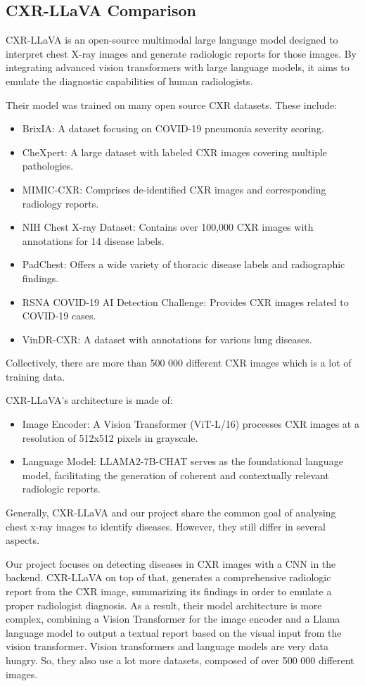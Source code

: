\documentclass[12pt, titlepage]{article}
\begin{document}
\subsection{CXR-LLaVA Comparison}
CXR-LLaVA is an open-source multimodal large language model designed to interpret chest X-ray images and generate radiologic reports for those images. By integrating advanced vision transformers with large language models, it aims to emulate the diagnostic capabilities of human radiologists.

Their model was trained on many open source CXR datasets. These include:
\begin{itemize}
\item BrixIA: A dataset focusing on COVID-19 pneumonia severity scoring.​
\item CheXpert: A large dataset with labeled CXR images covering multiple pathologies.
\item MIMIC-CXR: Comprises de-identified CXR images and corresponding radiology reports.​
\item NIH Chest X-ray Dataset: Contains over 100,000 CXR images with annotations for 14 disease labels.
\item PadChest: Offers a wide variety of thoracic disease labels and radiographic findings.​
\item RSNA COVID-19 AI Detection Challenge: Provides CXR images related to COVID-19 cases.​
\item VinDR-CXR: A dataset with annotations for various lung diseases.
\end{itemize}

Collectively, there are more than 500 000 different CXR images which is a lot of training data.

CXR-LLaVA's architecture is made of:​
\begin{itemize}
\item Image Encoder: A Vision Transformer (ViT-L/16) processes CXR images at a resolution of 512x512 pixels in grayscale.​
\item Language Model: LLAMA2-7B-CHAT serves as the foundational language model, facilitating the generation of coherent and contextually relevant radiologic reports.
\end{itemize}

Generally, CXR-LLaVA and our project share the common goal of analysing chest x-ray images to identify diseases. However, they still differ in several aspects.

Our project focuses on detecting diseases in CXR images with a CNN in the backend. CXR-LLaVA on top of that, generates a comprehensive radiologic report from the CXR image, summarizing its findings in order to emulate a proper radiologist diagnosis. As a result, their model architecture is more complex, combining a Vision Transformer for the image encoder and a Llama language model to output a textual report based on the visual input from the vision transformer. Vision transformers and language models are very data hungry. So, they also use a lot more datasets, composed of over 500 000 different images.
\end{document}
